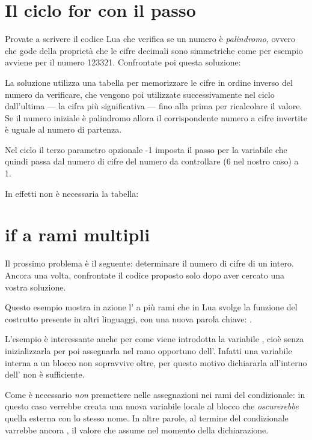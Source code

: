 \section{Il ciclo for con il passo}

Provate a scrivere il codice Lua che verifica se un numero è \emph{palindromo},
ovvero che gode della proprietà che le cifre decimali sono simmetriche come per
esempio avviene per il numero 123321. Confrontate poi questa soluzione:

La soluzione utilizza una tabella per memorizzare le cifre in ordine inverso
del numero da verificare, che vengono poi utilizzate successivamente nel ciclo
 dall'ultima --- la cifra più significativa --- fino alla prima per
ricalcolare il valore. Se il numero iniziale è palindromo allora il
corrispondente numero a cifre invertite è uguale al numero di partenza.

Nel ciclo  il terzo parametro opzionale -1 imposta il passo per la
variabile  che quindi passa dal numero di cifre del numero da
controllare (6 nel nostro caso) a 1.

In effetti non è necessaria la tabella:


\section{if a rami multipli}

Il prossimo problema è il seguente: determinare il numero di cifre di un
intero. Ancora una volta, confrontate il codice proposto solo dopo aver cercato
una vostra soluzione.

Questo esempio mostra in azione l' a più rami che in Lua svolge la
funzione del costrutto  presente in altri linguaggi, con una nuova
parola chiave: .

L'esempio è interessante anche per come viene introdotta la variabile
, cioè senza inizializzarla per poi assegnarla nel ramo opportuno
dell'. Infatti una variabile interna a un blocco non sopravvive oltre,
per questo motivo dichiararla all'interno dell' non è sufficiente.

Come è necessario \emph{non} premettere  nelle assegnazioni nei rami
del condizionale: in questo caso verrebbe creata una nuova variabile locale al
blocco che \emph{oscurerebbe} quella esterna con lo stesso nome. In altre
parole, al termine del condizionale  varrebbe ancora , il
valore che assume nel momento della dichiarazione.



